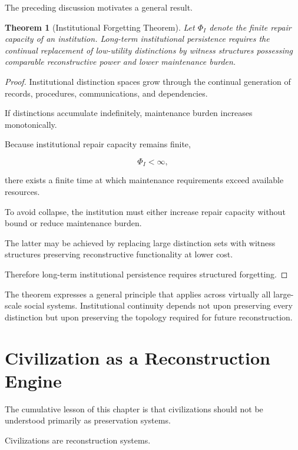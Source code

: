 \documentclass[12pt,oneside]{book}
\theoremstyle{plain} \newtheorem{theorem}{Theorem}[chapter] \newtheorem{lemma}[theorem]{Lemma} \newtheorem{proposition}[theorem]{Proposition} \newtheorem{corollary}[theorem]{Corollary}
\theoremstyle{definition} \newtheorem{definition}[theorem]{Definition} \newtheorem{axiom}[theorem]{Axiom} \newtheorem{construction}[theorem]{Construction}
\theoremstyle{remark} \newtheorem{remark}[theorem]{Remark} \newtheorem{example}[theorem]{Example}
\begin{document}
The preceding discussion motivates a general result.

\begin{theorem}[Institutional Forgetting Theorem]

Let $\Phi_I$ denote the finite repair capacity of an institution. Long-term institutional persistence requires the continual replacement of low-utility distinctions by witness structures possessing comparable reconstructive power and lower maintenance burden.

\end{theorem}

\begin{proof}

Institutional distinction spaces grow through the continual generation of records, procedures, communications, and dependencies.

If distinctions accumulate indefinitely, maintenance burden increases monotonically.

Because institutional repair capacity remains finite,

\[
\Phi_I
<
\infty,
\]

there exists a finite time at which maintenance requirements exceed available resources.

To avoid collapse, the institution must either increase repair capacity without bound or reduce maintenance burden.

The latter may be achieved by replacing large distinction sets with witness structures preserving reconstructive functionality at lower cost.

Therefore long-term institutional persistence requires structured forgetting.

\end{proof}

The theorem expresses a general principle that applies across virtually all large-scale social systems. Institutional continuity depends not upon preserving every distinction but upon preserving the topology required for future reconstruction.

\section{Civilization as a Reconstruction Engine}

The cumulative lesson of this chapter is that civilizations should not be understood primarily as preservation systems.

Civilizations are reconstruction systems.
\end{document}
